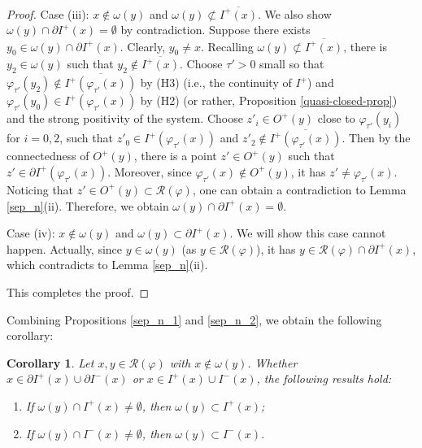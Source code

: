 \documentclass[a4paper,11pt]{article}
\theoremstyle{plain}
\newtheorem{cor}[thm]{Corollary}
\theoremstyle{definition}
\numberwithin{equation}{section}
\begin{document}
\begin{proof}
        Case (iii): $x\notin\omega(y)$ and $\omega(y)\not\subset  \overline{I^{+}(x)}$.
		We also show $\omega(y)\cap\partial  I^{+}(x)=\emptyset$ by contradiction.
		Suppose there exists $y_{0} \in\omega(y)\cap\partial  I^{+}(x)$. Clearly, $y_{0}\neq x$.
        Recalling $\omega(y)\not\subset  \overline{I^{+}(x)}$, there is $y_{2} \in\omega(y)$ such that $y_{2}\notin  \overline{I^{+}(x)}$. Choose $\tau'>0$ small so that $\varphi_{\tau'}(y_{2})\notin  \overline{I^{+}(\varphi_{\tau'}(x))}$ by (H3) (i.e., the continuity of $I^{+}$) and $\varphi_{\tau'}(y_{0})\in  I^{+}(\varphi_{\tau'}(x))$ by (H2) (or rather, Proposition \ref{quasi-closed-prop}) and the strong positivity of the system. Choose $z'_i\in O^{+}(y)$ close to $\varphi_{\tau'}(y_i)$ for $i=0,2$,
		such that $z'_0\in  I^{+}(\varphi_{\tau'}(x))$ and $z'_2\notin  \overline{I^{+}(\varphi_{\tau'}(x))}$. Then by the connectedness of $O^{+}(y)$, there is a point $z'\in O^{+}(y)$ such that $z'\in \partial  I^{+}(\varphi_{\tau'}(x))$. Moreover, since $\varphi_{\tau'}(x)\notin O^{+}(y)$, it has $z'\neq\varphi_{\tau'}(x)$. Noticing that $z'\in O^{+}(y)\subset \mathcal{R}(\varphi)$, one can obtain a contradiction to Lemma \ref{sep_n}(ii).
        Therefore, we obtain $\omega(y)\cap\partial  I^{+}(x)=\emptyset$.
        
        Case (iv): $x\notin\omega(y)$ and $\omega(y)\subset  \partial{I^{+}(x)}$. We will show this case cannot happen. Actually, since $y\in \omega(y)$ (as $y\in \mathcal{R}(\varphi)$), it has $y\in  \mathcal{R}(\varphi)\cap\partial{I^{+}(x)}$, which contradicts to Lemma \ref{sep_n}(ii).
        
        This completes the proof.
	\end{proof}


Combining Propositions \ref{sep_n_1} and \ref{sep_n_2}, we obtain the following corollary:

	\begin{cor}\label{absorb}
		Let $x,y\in \mathcal{R}(\varphi)$ with $x\notin\omega(y)$. Whether $x\in \partial I^{+}(x)\cup \partial I^{-}(x)$ or $x\in I^{+}(x)\cup I^{-}(x)$, the following results hold: 
        \begin{enumerate}[{\rm (i)}]
            \item If $\omega(y)\cap I^{+}(x)\neq\emptyset$, then $\omega(y)\subset I^{+}(x)$;
            \item If $\omega(y)\cap I^{-}(x)\neq\emptyset$, then $\omega(y)\subset I^{-}(x)$.
        \end{enumerate}
	\end{cor}
\end{document}
